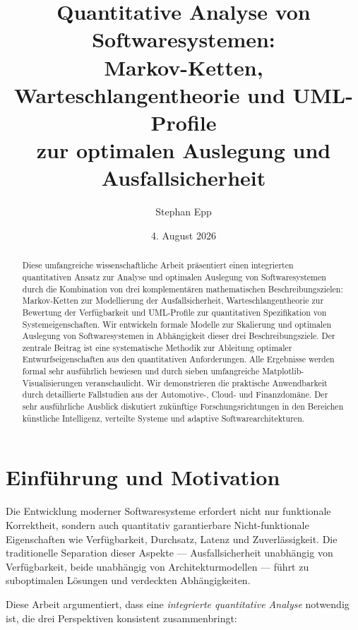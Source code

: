 \documentclass[a4paper,11pt]{article}
\title{Quantitative Analyse von Softwaresystemen:\\
Markov-Ketten, Warteschlangentheorie und UML-Profile\\
zur optimalen Auslegung und Ausfallsicherheit}
\author{Stephan Epp}
\date{4. August 2026}
\theoremstyle{definition}
\begin{document}
\maketitle

\begin{abstract}
Diese umfangreiche wissenschaftliche Arbeit präsentiert einen integrierten quantitativen Ansatz 
zur Analyse und optimalen Auslegung von Softwaresystemen durch die Kombination von drei komplementären 
mathematischen Beschreibungszielen: Markov-Ketten zur Modellierung der Ausfallsicherheit, 
Warteschlangentheorie zur Bewertung der Verfügbarkeit und UML-Profile zur quantitativen Spezifikation 
von Systemeigenschaften. Wir entwickeln formale Modelle zur Skalierung und optimalen Auslegung von 
Softwaresystemen in Abhängigkeit dieser drei Beschreibungsziele. Der zentrale Beitrag ist eine 
systematische Methodik zur Ableitung optimaler Entwurfseigenschaften aus den quantitativen 
Anforderungen. Alle Ergebnisse werden formal sehr ausführlich bewiesen und durch sieben umfangreiche 
Matplotlib-Visualisierungen veranschaulicht. Wir demonstrieren die praktische Anwendbarkeit durch 
detaillierte Fallstudien aus der Automotive-, Cloud- und Finanzdomäne. Der sehr ausführliche Ausblick 
diskutiert zukünftige Forschungsrichtungen in den Bereichen künstliche Intelligenz, verteilte Systeme 
und adaptive Softwarearchitekturen.
\end{abstract}

\newpage
\tableofcontents
\newpage

\section{Einführung und Motivation}

Die Entwicklung moderner Softwaresysteme erfordert nicht nur funktionale Korrektheit, sondern auch 
quantitativ garantierbare Nicht-funktionale Eigenschaften wie Verfügbarkeit, Durchsatz, Latenz und 
Zuverlässigkeit. Die traditionelle Separation dieser Aspekte --- Ausfallsicherheit unabhängig von 
Verfügbarkeit, beide unabhängig von Architekturmodellen --- führt zu suboptimalen Lösungen und 
verdeckten Abhängigkeiten.

Diese Arbeit argumentiert, dass eine \emph{integrierte quantitative Analyse} notwendig ist, die 
drei Perspektiven konsistent zusammenbringt:
\end{document}
